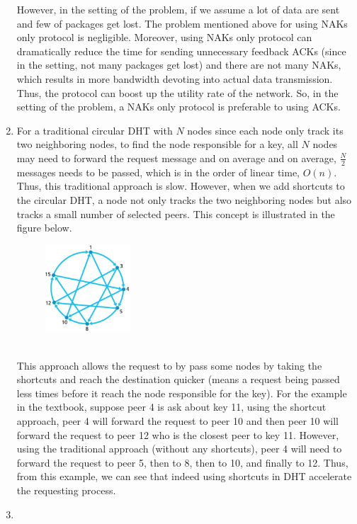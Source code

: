 \documentclass[12pt]{article}
\begin{document}
\begin{singlespace}
\begin{enumerate}
	However, in the setting of the problem, if we assume a lot of data are sent and few of packages get lost. The problem mentioned above for using NAKs only protocol is negligible. Moreover, using NAKs only protocol can dramatically reduce the time for sending unnecessary feedback ACKs (since in the setting, not many packages get lost) and there are not many NAKs, which results in more bandwidth devoting into actual data transmission. Thus, the protocol can boost up the utility rate of the network. So, in the setting of the problem, a NAKs only protocol is preferable to using ACKs.
\item 
	For a traditional circular DHT with $N$ nodes since each node only track its two neighboring nodes, to find the node responsible for a key, all $N$ nodes may need to forward the request message and on average and on average, $\frac{N}{2}$ messages needs to be passed, which is in the order of linear time, $O(n)$. Thus, this traditional approach is slow. However, when we add shortcuts to the circular DHT, a node not only tracks the two neighboring nodes but also tracks a small number of selected peers. This concept is illustrated in the figure below. 
	\begin{figure}[h]
	\centering
	\includegraphics[width=0.3\textwidth]{6} 
	\end{figure}
	\\This approach allows the request to by pass some nodes by taking the shortcuts and reach the destination quicker (means a request being passed less times before it reach the node responsible for the key). For the example in the textbook, suppose peer 4 is ask about key 11, using the shortcut approach, peer 4 will forward the request to peer 10 and then peer 10 will forward the request to peer 12 who is the closest peer to key 11. However, using the traditional approach (without any shortcuts), peer 4 will need to forward the request to peer 5, then to 8, then to 10, and finally to 12. Thus, from this example, we can see that indeed using shortcuts in DHT accelerate the requesting process.
\item
	\begin{itemize}

\end{itemize}
\end{enumerate}
\end{singlespace}
\end{document}
